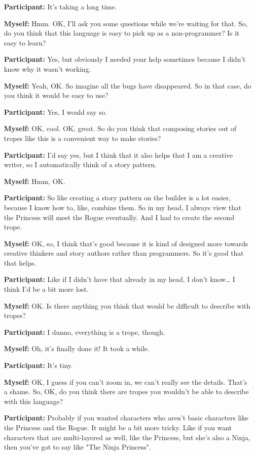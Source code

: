 \documentclass[11pt]{report}
\begin{document}
\begin{linenumbers}
\textbf{Participant:} It's taking a long time.

\textbf{Myself:} Hmm. OK, I'll ask you some questions while we're waiting for that. So, do you think that this language is easy to pick up as a non-programmer? Is it easy to learn?

\textbf{Participant:} Yes, but obviously I needed your help sometimes because I didn't know why it wasn't working.

\textbf{Myself:} Yeah, OK. So imagine all the bugs have disappeared. So in that case, do you think it would be easy to use?

\textbf{Participant:} Yes, I would say so.

\textbf{Myself:} OK, cool. OK, great. So do you think that composing stories out of tropes like this is a convenient way to make stories?

\textbf{Participant:} I'd say yes, but I think that it also helps that I am a creative writer, so I automatically think of a story pattern.

\textbf{Myself:} Hmm, OK.

\textbf{Participant:} So like creating a story pattern on the builder is a lot easier, because I know how to, like, combine them. So in my head, I always view that the Princess will meet the Rogue eventually. And I had to create the second trope.

\textbf{Myself:} OK, so, I think that's good because it is kind of designed more towards creative thinkers and story authors rather than programmers. So it's good that that helps.

\textbf{Participant:} Like if I didn't have that already in my head, I don't know\ldots{} I think I'd be a bit more lost.

\textbf{Myself:} OK. Is there anything you think that would be difficult to describe with tropes?

\textbf{Participant:} I dunno, everything is a trope, though.

\textbf{Myself:} Oh, it's finally done it! It took a while.

\textbf{Participant:} It's tiny.

\textbf{Myself:} OK, I guess if you can't zoom in, we can't really see the details. That's a shame. So, OK, do you think there are tropes you wouldn't be able to describe with this language?

\textbf{Participant:} Probably if you wanted characters who aren't basic characters like the Princess and the Rogue. It might be a bit more tricky. Like if you want characters that are multi-layered as well, like the Princess, but she's also a Ninja, then you've got to say like "The Ninja Princess".


\end{linenumbers}
\end{document}
